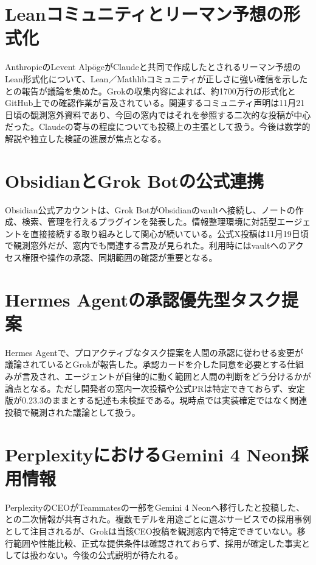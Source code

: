 \section{Leanコミュニティとリーマン予想の形式化}
AnthropicのLevent AlpögeがClaudeと共同で作成したとされるリーマン予想のLean形式化について、Lean／Mathlibコミュニティが正しさに強い確信を示したとの報告が議論を集めた。Grokの収集内容によれば、約1700万行の形式化とGitHub上での確認作業が言及されている。関連するコミュニティ声明は11月21日頃の観測窓外資料であり、今回の窓内ではそれを参照する二次的な投稿が中心だった。Claudeの寄与の程度についても投稿上の主張として扱う。今後は数学的解説や独立した検証の進展が焦点となる。

\section{ObsidianとGrok Botの公式連携}
Obsidian公式アカウントは、Grok BotがObsidianのvaultへ接続し、ノートの作成、検索、管理を行えるプラグインを発表した。情報整理環境に対話型エージェントを直接接続する取り組みとして関心が続いている。公式X投稿は11月19日頃で観測窓外だが、窓内でも関連する言及が見られた。利用時にはvaultへのアクセス権限や操作の承認、同期範囲の確認が重要となる。

\section{Hermes Agentの承認優先型タスク提案}
Hermes Agentで、プロアクティブなタスク提案を人間の承認に従わせる変更が議論されているとGrokが報告した。承認カードを介した同意を必要とする仕組みが言及され、エージェントが自律的に動く範囲と人間の判断をどう分けるかが論点となる。ただし開発者の窓内一次投稿や公式PRは特定できておらず、安定版が0.23.3のままとする記述も未検証である。現時点では実装確定ではなく関連投稿で観測された議論として扱う。

\section{PerplexityにおけるGemini 4 Neon採用情報}
PerplexityのCEOがTeammatesの一部をGemini 4 Neonへ移行したと投稿した、との二次情報が共有された。複数モデルを用途ごとに選ぶサービスでの採用事例として注目されるが、Grokは当該CEO投稿を観測窓内で特定できていない。移行範囲や性能比較、正式な提供条件は確認されておらず、採用が確定した事実としては扱わない。今後の公式説明が待たれる。

